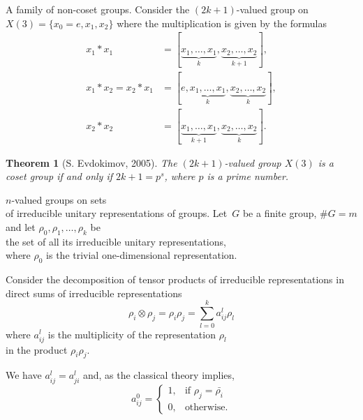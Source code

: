 \documentclass{beamer}
\newtheorem{thm}{Theorem}
\begin{document}
\begin{frame}{A family of non-coset groups.}
Consider the $(2k+1)$-valued group on $X(3)=\{x_0=e,x_1,x_2\}$ where the  multiplication is given by the formulas
\begin{align*}
x_1*x_1 &= [\underbrace{x_1,\dots,x_1}_{k},\underbrace{x_2,\dots,x_2}_{k+1}],\\[7pt]
x_1*x_2=x_2*x_1 &= [e,\underbrace{x_1,\dots,x_1}_{k},\underbrace{x_2,\dots,x_2}_{k}],\\[7pt]
x_2*x_2 &= [\underbrace{x_1,\dots,x_1}_{k+1},\underbrace{x_2,\dots,x_2}_{k}].
\end{align*}
\begin{thm}[S. Evdokimov, 2005]
The $(2k+1)$-valued group $X(3)$ is a coset group if and only if $2k+1=p^s$, where $p$ is a prime number.
\end{thm}

\end{frame}





\begin{frame}{$n$-valued groups on sets\\ of irreducible unitary representations of groups.}
Let~$G$ be a finite group, $\# G=m$\; and\; let $\rho_0, \rho_1, \ldots, \rho_k$ be\\
the set of all its irreducible unitary representations,\\
where $\rho_0$ is the trivial one-dimensional representation.
\vspace{0.2cm}

Consider the decomposition of tensor products of irreducible representations in direct sums of irreducible representations
\[
\rho_i \otimes \rho_j = \rho_i \rho_j = \sum_{l=0}^k a_{ij}^l \rho_l
\]
where $a_{ij}^l$ is the multiplicity of the representation $\rho_l$\\ in the product $\rho_i \rho_j$.
\vspace{0.2cm}

We have $a_{ij}^l=a_{ji}^l$ and, as the classical theory implies,
\[
a_{ij}^0 =
\begin{cases}
  1, & \mbox{if } \rho_j=\bar{\rho_i} \\
  0, & \mbox{otherwise}.
\end{cases}
\]
\end{frame}
\end{document}
